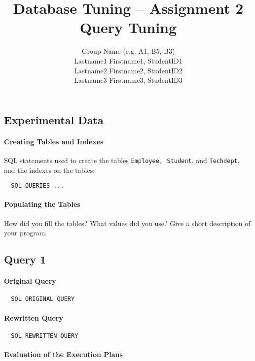 \documentclass[11pt]{scrartcl}
\title{
  \textbf{\large Database Tuning -- Assignment 2}\\
  Query Tuning
}
\author{
 Group Name (e.g. A1, B5, B3)\\
 \large Lastname1 Firstname1, StudentID1 \\
 \large Lastname2 Firstname2, StudentID2 \\
 \large Lastname3 Firstname3, StudentID3 
}
\begin{document}
\maketitle

\subsection*{Experimental Data}

\paragraph{Creating Tables and Indexes}

SQL statements used to create the tables {\tt Employee}, {\tt
  Student}, and {\tt Techdept}, and the indexes on the tables:

{\small
\begin{verbatim}
  SQL QUERIES ...
\end{verbatim}
}

\paragraph{Populating the Tables}

How did you fill the tables? What values did you use? Give a short
description of your program.

\subsection*{Query 1}

\paragraph{Original Query}

{\small
\begin{verbatim}
  SQL ORIGINAL QUERY
\end{verbatim}
}

\paragraph{Rewritten Query}

{\small
\begin{verbatim}
  SQL REWRITTEN QUERY
\end{verbatim}
}

\paragraph{Evaluation of the Execution Plans}
\end{document}
